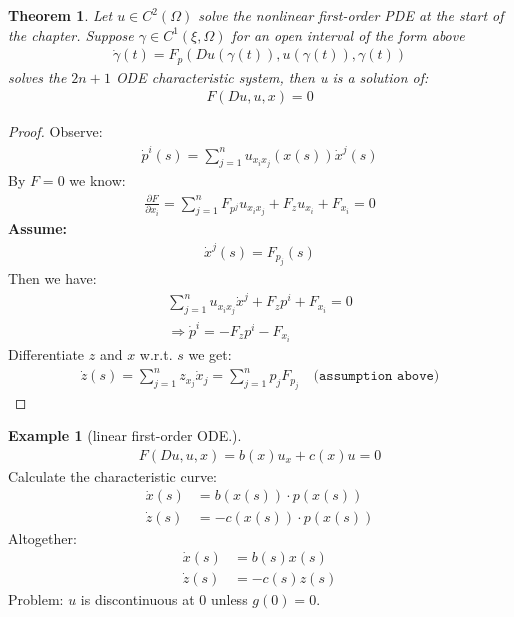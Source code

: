 \documentclass[a4paper,11pt,oneside,fleqn]{book}
\newtheorem{theorem}{Theorem}[section]
\theoremstyle{definition}
\newtheorem*{example}{Example}
\theoremstyle{remark}
\begin{document}
 

\begin{theorem}
	Let $u \in C^2(\Omega)$ solve the nonlinear first-order PDE at the start of the chapter. 
	Suppose $\gamma \in C^1(\xi, \Omega)$ for an open interval of the form above
	\begin{align*}
		\dot{\gamma}(t) = F_p (Du(\gamma(t)), u(\gamma(t)), \gamma(t)) 
	\end{align*}
	solves the $2n+1$ ODE characteristic system, then u is a solution of:
	\begin{align*}
		F(Du, u, x) = 0
	\end{align*} 
\end{theorem}
\begin{proof}
Observe:
\begin{align*}
	\dot{p}^i(s) = \sum_{j = 1}^n u_{x_i x_j}(x(s)) \dot{x}^j(s)
\end{align*}
By $F = 0$ we know:
\begin{align*}
	\frac{\partial F}{\partial x_i} = \sum_{j = 1}^n F_{p^j}u_{x_i x_j} + F_z u_{x_i} + F_{x_i} = 0
\end{align*}
\textbf{Assume:}
\begin{align}
	\dot{x}^j(s) = F_{p_j}(s)
\end{align}
Then we have:
\begin{align*}
	\sum_{j = 1}^n u_{x_i x_j} \dot{x}^j + F_z p^i + F_{x_i} = 0\\
	\Rightarrow \dot{p}^i = - F_z p^i - F_{x_i}
\end{align*}
Differentiate $z$ and $x$ w.r.t. $s$ we get:
\begin{align*}
	\dot{z}(s) = \sum_{j = 1}^n z_{x_j} \dot{x}_j = \sum_{j = 1}^n p_j F_{p_j} \quad\texttt{(assumption above)}
\end{align*}
\end{proof}



\begin{example}[linear first-order ODE.]
\begin{align*}
	F(Du, u, x) = b(x)u_x + c(x)u = 0
\end{align*}
Calculate the characteristic curve:
\begin{align*}
	\dot{x}(s) &= b(x(s)) \cdot p(x(s))\\
	\dot{z}(s) &= - c(x(s))  \cdot p(x(s))
\end{align*}
Altogether:
\begin{align*}
	\dot{x}(s) &= b(s)x(s) \\
	\dot{z}(s) &= -c(s)z(s) 
\end{align*}
Problem: $u$ is discontinuous at $0$ unless $g(0) = 0$. 
\end{example}
\end{document}

